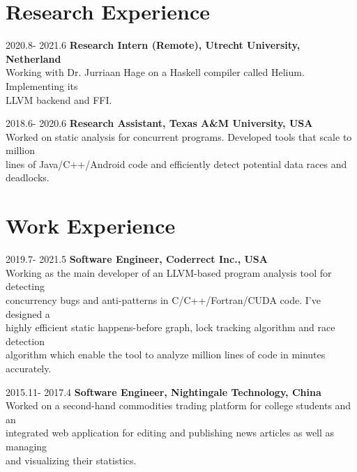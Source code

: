 \documentclass[12pt,letterpaper]{report}
\begin{document}

\section*{Research Experience}

\begin{tablist}[style=multiline, leftmargin=*]
	\item[2020.8- 2021.6]
	\tab \textbf{Research Intern (Remote), Utrecht University, Netherland}\\
	\tab Working with Dr. Jurriaan Hage on a Haskell compiler called Helium. Implementing its\\
	\tab LLVM backend and FFI.
	\item[2018.6- 2020.6]
	\tab \textbf{Research Assistant, Texas A\&M University, USA}\\
	\tab Worked on static analysis for concurrent programs. Developed tools that scale to million\\
	\tab lines of Java/C++/Android code and efficiently detect potential data races and deadlocks.
\end{tablist}


\section*{Work Experience}

\begin{tablist}[style=multiline, leftmargin=*]
	\item[2019.7- 2021.5]
	\tab \textbf{Software Engineer, Coderrect Inc., USA}\\
	\tab Working as the main developer of an LLVM-based program analysis tool for detecting\\
	\tab concurrency bugs and anti-patterns in C/C++/Fortran/CUDA code. I've designed a\\
	\tab highly efficient static happens-before graph, lock tracking algorithm and race detection\\
	\tab algorithm which enable the tool to analyze million lines of code in minutes accurately.
	\item[2015.11- 2017.4]
	\tab \textbf{Software Engineer, Nightingale Technology, China}\\
	\tab Worked on a second-hand commodities trading platform for college students and an\\
	\tab integrated web application for editing and publishing news articles as well as managing\\
	\tab and visualizing their statistics.
\end{tablist}
\end{document}
